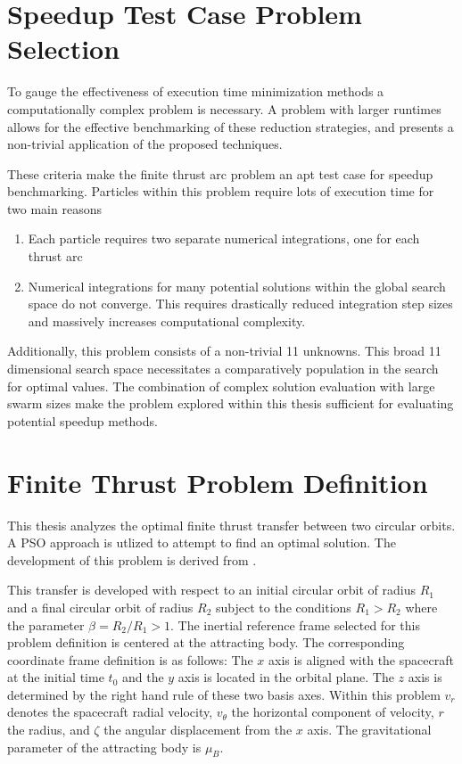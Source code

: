 \section{Speedup Test Case Problem Selection} \label{problemSelection}

\noindent To gauge the effectiveness of execution time minimization methods a computationally complex problem is 
necessary. A problem with larger runtimes allows for the effective benchmarking of these reduction strategies,
and presents a non-trivial application of the proposed techniques.\newline

\noindent These criteria make the finite thrust arc problem an apt test case for speedup benchmarking. 
Particles within this problem require lots of execution time for two main reasons

\begin{enumerate}
    \item Each particle requires two separate numerical integrations, one for each thrust arc
    \item Numerical integrations for many potential solutions within the global search space do not converge.
    This requires drastically reduced integration step sizes and massively increases computational complexity. 
\end{enumerate}

\noindent Additionally, this problem consists of a non-trivial 11 unknowns. This broad 11 dimensional search space necessitates 
a comparatively population
in the search for optimal values. The combination of complex solution evaluation with large swarm sizes make the problem explored within
this thesis sufficient for evaluating potential speedup methods.


\section{Finite Thrust Problem Definition}

\noindent This thesis analyzes the optimal finite thrust transfer between two circular orbits. A PSO approach is utlized to attempt
to find an optimal solution. The development of this problem is derived from \citep{Pontani_Conway}. \newline

\noindent This transfer is developed with respect to an initial circular orbit of radius $R_1$ and a final circular orbit of radius $R_2$ subject to the conditions $R_1 > R_2$ where the parameter $\beta = R_2/R_1 > 1$. 
The inertial reference frame selected for this problem definition is centered at the attracting body. The corresponding coordinate frame definition is as follows: The $x$ axis is aligned with the spacecraft at the initial time $t_0$ and the $y$ axis is located in the orbital plane.
The $z$ axis is determined by the right hand rule of these two basis axes. Within this problem $v_r$ denotes the spacecraft radial velocity, $v_\theta$ the horizontal component of velocity, $r$ the radius, and $\zeta$ the angular displacement from the $x$ axis. The gravitational
parameter of the attracting body is $\mu_B$. \newline

